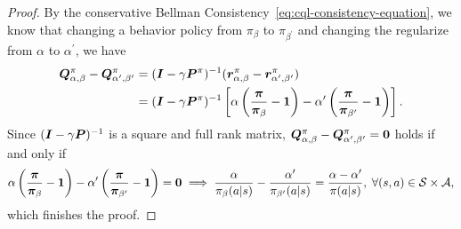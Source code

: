\begin{proof}
\label{proof:mixing-dip-main}
By the conservative Bellman Consistency~\eqref{eq:cql-consistency-equation}, we know that changing a behavior policy from $\pi_\beta$ to $\pi_{\beta^\prime}$ and changing the regularize from $\alpha$ to $\alpha^\prime$, we have
\begin{equation}
    \begin{split}
        \boldsymbol Q_{\alpha,\beta}^{\pi} - \boldsymbol Q_{\alpha^\prime,\beta^\prime}^{\pi} & = (\boldsymbol I - \gamma \boldsymbol P^\pi)^{-1}(\boldsymbol r_{\alpha,\beta}^\pi-\boldsymbol r_{\alpha^\prime,\beta^\prime}^\pi)  \\
        & =(\boldsymbol I - \gamma \boldsymbol P^\pi)^{-1}\left[ \alpha\left( \frac{\boldsymbol\pi}{\boldsymbol\pi_\beta}-\boldsymbol 1 \right)-\alpha^\prime\left( \frac{\boldsymbol\pi}{\boldsymbol\pi_{\beta^\prime}}-\boldsymbol 1 \right) \right].
    \end{split} 
\end{equation}
Since $(\boldsymbol I - \gamma \boldsymbol P)^{-1}$ is a square and full rank matrix, $ \boldsymbol Q_{\alpha,\beta}^{\pi} - \boldsymbol Q_{\alpha^\prime,\beta^\prime}^{\pi} = \boldsymbol 0$ holds if and only if
\begin{equation}
    \alpha\left( \frac{\boldsymbol\pi}{\boldsymbol\pi_\beta}-\boldsymbol 1 \right)-\alpha^\prime\left( \frac{\boldsymbol\pi}{\boldsymbol\pi_{\beta^\prime}}-\boldsymbol 1 \right) = \boldsymbol 0\implies \frac{\alpha}{\pi_\beta(a|s)}-\frac{\alpha^\prime}{\pi_{\beta^\prime}(a|s)}=\frac{\alpha-\alpha^\prime}{\pi(a|s)},\;\forall (s,a)\in \mathcal S\times \mathcal A,
\end{equation}
which finishes the proof.
\end{proof}

\fi
